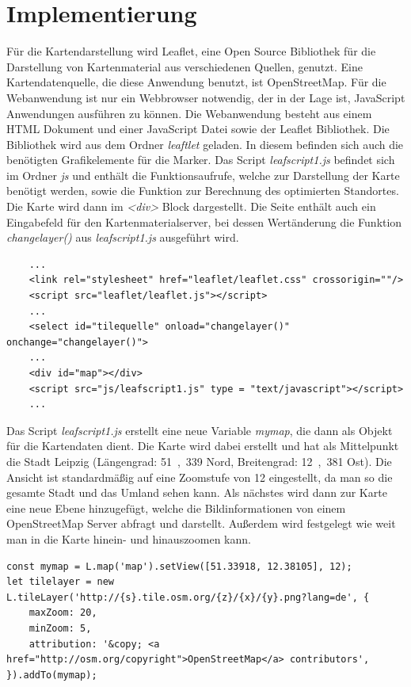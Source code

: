 \documentclass[a4paper, 12pt]{scrreprt}
\begin{document}
\chapter{Implementierung}
Für die Kartendarstellung wird Leaflet\cite{crickard2014leaflet}, eine Open Source Bibliothek für die Darstellung von Kartenmaterial aus verschiedenen Quellen, genutzt.
Eine Kartendatenquelle, die diese Anwendung benutzt, ist OpenStreetMap.
Für die Webanwendung ist nur ein Webbrowser notwendig, der in der Lage ist, JavaScript Anwendungen ausführen zu können.
Die Webanwendung besteht aus einem HTML Dokument und einer JavaScript Datei sowie der Leaflet Bibliothek.
Die Bibliothek wird aus dem Ordner \textit{leaftlet} geladen.
In diesem befinden sich auch die benötigten Grafikelemente für die Marker.
Das Script \textit{leafscript1.js} befindet sich im Ordner \textit{js} und enthält die Funktionsaufrufe, welche zur Darstellung der Karte benötigt werden, sowie die Funktion zur Berechnung des optimierten Standortes.
Die Karte wird dann im \textit{<div>} Block dargestellt.
Die Seite enthält auch ein Eingabefeld für den Kartenmaterialserver, bei dessen Wertänderung die Funktion \textit{changelayer()} aus \textit{leafscript1.js} ausgeführt wird.
\begin{lstlisting}
	...
	<link rel="stylesheet" href="leaflet/leaflet.css" crossorigin=""/>
	<script src="leaflet/leaflet.js"></script>
	...
	<select id="tilequelle" onload="changelayer()" onchange="changelayer()">
	...
	<div id="map"></div>
	<script src="js/leafscript1.js" type = "text/javascript"></script>
	...
\end{lstlisting}
Das Script \textit{leafscript1.js} erstellt eine neue Variable \textit{mymap}, die dann als Objekt für die Kartendaten dient.
Die Karte wird dabei erstellt und hat als Mittelpunkt die Stadt Leipzig (Längengrad: \si{51{,}339}{\textdegree}  Nord, Breitengrad: \si{12{,}381}{\textdegree}  Ost). Die Ansicht ist standardmäßig auf eine Zoomstufe von 12 eingestellt, da man so die gesamte Stadt und das Umland sehen kann.
Als nächstes wird dann zur Karte eine neue Ebene hinzugefügt, welche die Bildinformationen von einem OpenStreetMap Server abfragt und darstellt.
Außerdem wird festgelegt wie weit man in die Karte hinein- und hinauszoomen kann.
\lstset{language=Java}
\begin{lstlisting}
const mymap = L.map('map').setView([51.33918, 12.38105], 12);
let tilelayer = new L.tileLayer('http://{s}.tile.osm.org/{z}/{x}/{y}.png?lang=de', {
	maxZoom: 20,
	minZoom: 5,
	attribution: '&copy; <a href="http://osm.org/copyright">OpenStreetMap</a> contributors',
}).addTo(mymap);
\end{lstlisting}
\end{document}
